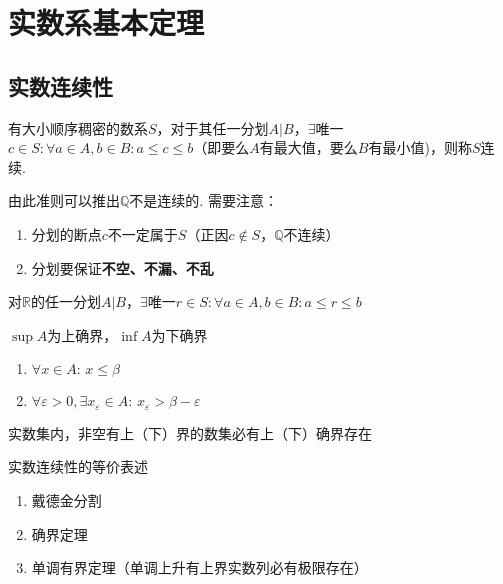 
\section{实数系基本定理}
\subsection{实数连续性}
\begin{definition}
有大小顺序稠密的数系$S$，对于其任一分划$A|B$，$\exists$唯一$c\in S:\forall a\in A,b\in B:a\leq c\leq b$（即要么$A$有最大值，要么$B$有最小值)，则称$S$连续. 
\end{definition}
由此准则可以推出$\mathbb{Q}$不是连续的. 需要注意：
\begin{enumerate}
	\itemsep -3pt
	\item 分划的断点$c$不一定属于$S$（正因$c\notin S$，$\mathbb{Q}$不连续）
	\item 分划要保证\textbf{不空、不漏、不乱}
\end{enumerate}
\begin{theorem}[实数基本定理]
对$\mathbb{R}$的任一分划$A|B$，$\exists$唯一$r\in S:\forall a\in A,b\in B:a\leq r\leq b$
\end{theorem}
\begin{definition}[确界]
$\sup A$为上确界，$\inf A$为下确界
\begin{enumerate}
	\item $\forall x\in A:\,x\leq\beta$
	\item $\forall\varepsilon>0,\exists x_\varepsilon\in A:\,x_\varepsilon >\beta-\varepsilon$
\end{enumerate}
\end{definition}
\begin{theorem}[确界定理]
实数集内，非空有上（下）界的数集必有上（下）确界存在
\end{theorem}
实数连续性的等价表述
\begin{enumerate}
	\item 戴德金分割
	\item 确界定理
	\item 单调有界定理（单调上升有上界实数列必有极限存在）
\end{enumerate}

